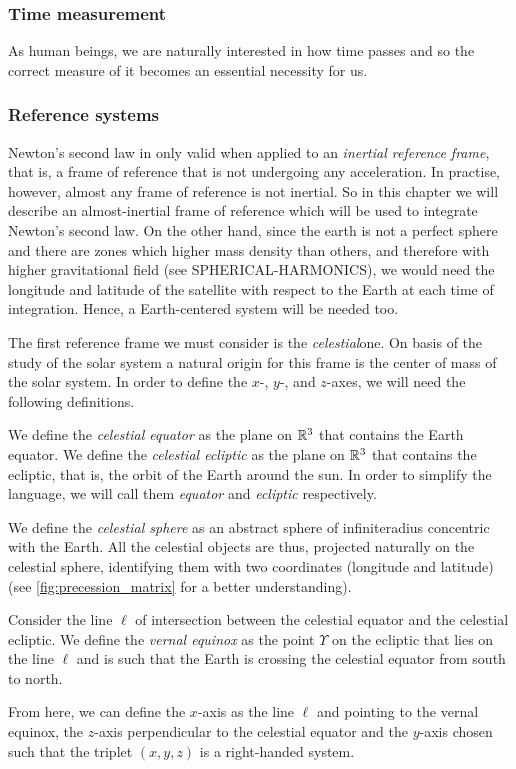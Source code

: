 \documentclass[../main.tex]{subfiles}
\begin{document}
\subsubsection{Time measurement}
As human beings, we are naturally interested in how time passes and so the correct measure of it becomes an essential necessity for us.

\subsubsection{Reference systems}
Newton's second law in only valid when applied to an \emph{inertial reference frame}, that is, a frame of reference that is not undergoing any acceleration. In practise, however, almost any frame of reference is not inertial. So in this chapter we will describe an almost-inertial frame of reference which will be used to integrate Newton's second law. On the other hand, since the earth is not a perfect sphere and there are zones which higher mass density than others, and therefore with higher gravitational field (see SPHERICAL-HARMONICS), we would need the longitude and latitude of the satellite with respect to the Earth at each time of integration. Hence, a Earth-centered system will be needed too.

The first reference frame we must consider is the \emph{celestial}one. On basis of the study of the solar system a natural origin for this frame is the center of mass of the solar system. In order to define the $x$-, $y$-, and $z$-axes, we will need the following definitions.
\begin{definition}
  We define the \emph{celestial equator} as the plane on $\mathbb{R}^3$ that contains the Earth equator. We define the \emph{celestial ecliptic} as the plane on $\mathbb{R}^3$ that contains the ecliptic, that is, the orbit of the Earth around the sun. In order to simplify the language, we will call them \emph{equator} and \emph{ecliptic} respectively.
\end{definition}
\begin{definition}
  We define the \emph{celestial sphere} as an abstract sphere of infiniteradius concentric with the Earth. All the celestial objects are thus, projected naturally on the celestial sphere, identifying them with two coordinates (longitude and latitude) (see \cref{fig:precession_matrix} for a better understanding).
\end{definition}
\begin{definition}
  Consider the line $\ell$ of intersection between the celestial equator and the celestial ecliptic. We define the \emph{vernal equinox} as the point $\Upsilon$ on the ecliptic that lies on the line $\ell$ and is such that the Earth is crossing the celestial equator from south to north.
\end{definition}
From here, we can define the $x$-axis as the line $\ell$ and pointing to the vernal equinox, the $z$-axis perpendicular to the celestial equator and the $y$-axis chosen such that the triplet $(x,y,z)$ is a right-handed system.
\end{document}
